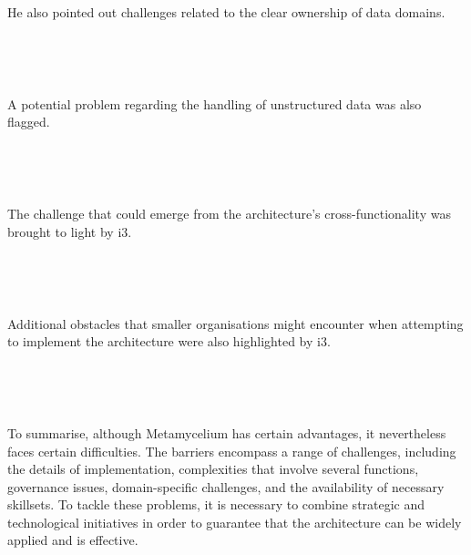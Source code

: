 \documentclass[journal]{IEEEtran}
\begin{document}
He also pointed out challenges related to the clear ownership of data domains.

\,

\setlength{\fboxsep}{0.4em}
\noindent{}

\,

A potential problem regarding the handling of unstructured data was also flagged.

\,

\setlength{\fboxsep}{0.4em}
\noindent{}

\,

The challenge that could emerge from the architecture's cross-functionality was brought to light by i3.

\,

\setlength{\fboxsep}{0.4em}
\noindent{}

\,

Additional obstacles that smaller organisations might encounter when attempting to implement the architecture were also highlighted by i3.

\,

\setlength{\fboxsep}{0.4em}
\noindent{}

\,

To summarise, although Metamycelium has certain advantages, it nevertheless faces certain difficulties. The barriers encompass a range of challenges, including the details of implementation, complexities that involve several functions, governance issues, domain-specific challenges, and the availability of necessary skillsets. To tackle these problems, it is necessary to combine strategic and technological initiatives in order to guarantee that the architecture can be widely applied and is effective.
\end{document}
